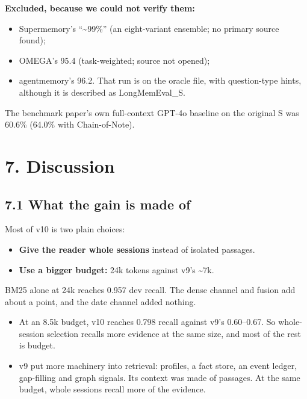\documentclass[11pt]{article}
\providecommand{\tightlist}{\setlength{\itemsep}{0pt}\setlength{\parskip}{0pt}}
\begin{document}
\textbf{Excluded, because we could not verify them:}

\begin{itemize}
\tightlist
\item
  Supermemory's ``\textasciitilde99\%'' (an eight-variant ensemble; no primary source found);
\item
  OMEGA's 95.4 (task-weighted; source not opened);
\item
  agentmemory's 96.2. That run is on the oracle file, with question-type hints, although it is described as
  LongMemEval\_S.
\end{itemize}

The benchmark paper's own full-context GPT-4o baseline on the original S was 60.6\% (64.0\% with
Chain-of-Note).

\hypertarget{discussion}{%
\section{7. Discussion}\label{discussion}}

\hypertarget{what-the-gain-is-made-of}{%
\subsection{7.1 What the gain is made of}\label{what-the-gain-is-made-of}}

Most of v10 is two plain choices:

\begin{itemize}
\tightlist
\item
  \textbf{Give the reader whole sessions} instead of isolated passages.
\item
  \textbf{Use a bigger budget:} 24k tokens against v9's \textasciitilde7k.
\end{itemize}

BM25 alone at 24k reaches 0.957 dev recall. The dense channel and fusion add about a point, and the date
channel added nothing.

\begin{itemize}
\tightlist
\item
  At an 8.5k budget, v10 reaches 0.798 recall against v9's 0.60--0.67. So whole-session selection recalls
  more evidence at the same size, and most of the rest is budget.
\item
  v9 put more machinery into retrieval: profiles, a fact store, an event ledger, gap-filling and graph
  signals. Its context was made of passages. At the same budget, whole sessions recall more of the
  evidence.
\end{itemize}
\end{document}
